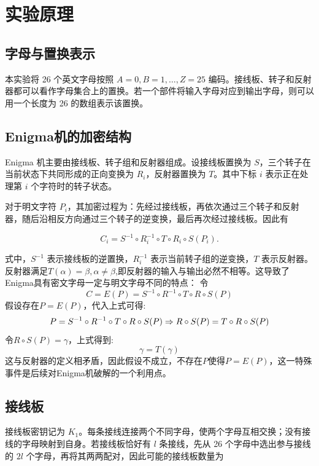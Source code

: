 \section{实验原理}

\subsection{字母与置换表示}

本实验将 26 个英文字母按照 $A=0,B=1,\ldots,Z=25$ 编码。接线板、转子和反射器都可以看作字母集合上的置换。若一个部件将输入字母对应到输出字母，则可以用一个长度为 26 的数组表示该置换。

\subsection{Enigma机的加密结构}

Enigma 机主要由接线板、转子组和反射器组成。设接线板置换为 $S$，三个转子在当前状态下共同形成的正向变换为 $R_i$，反射器置换为 $T$。其中下标 $i$ 表示正在处理第 $i$ 个字符时的转子状态。

对于明文字符 $P_i$，其加密过程为：先经过接线板，再依次通过三个转子和反射器，随后沿相反方向通过三个转子的逆变换，最后再次经过接线板。因此有

\begin{equation*}
    C_i=S^{-1} \circ R_i^{-1} \circ T \circ R_i \circ S(P_i).
\end{equation*}

式中，$S^{-1}$ 表示接线板的逆置换，$R_i^{-1}$ 表示当前转子组的逆变换，$T$ 表示反射器。反射器满足$T(\alpha) = \beta,\alpha \neq \beta$,即反射器的输入与输出必然不相等。这导致了Enigma具有密文字母一定与明文字母不同的特点：
令
$$
C = E(P) = S^{-1} \circ R^{-1} \circ T \circ R \circ S(P)
$$
假设存在$P = E(P)$，代入上式可得:
$$
P = S^{-1} \circ R^{-1} \circ T \circ R \circ S(P) \Rightarrow \\
R \circ  S(P) = T \circ R \circ S(P)
$$
令$ R \circ S(P) = \gamma $，上式得到:
$$
\gamma = T(\gamma)
$$
这与反射器的定义相矛盾，因此假设不成立，不存在$P$使得$P = E(P)$，这一特殊事件是后续对Enigma机破解的一个利用点。

\subsection{接线板}

接线板密钥记为 $K_1$。每条接线连接两个不同字母，使两个字母互相交换；没有接线的字母映射到自身。若接线板恰好有 $l$ 条接线，先从 26 个字母中选出参与接线的 $2l$ 个字母，再将其两两配对，因此可能的接线板数量为

